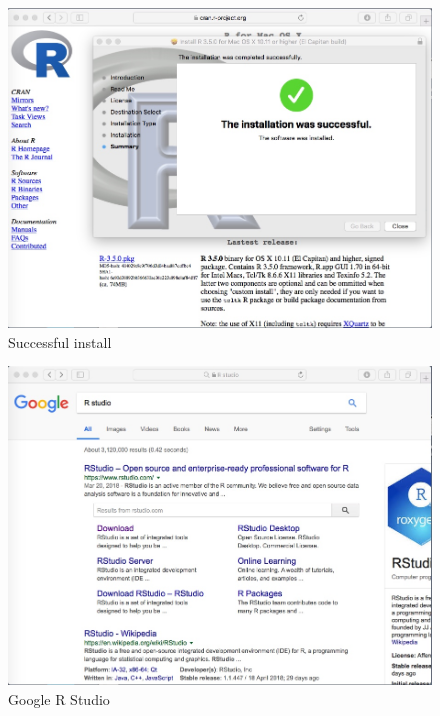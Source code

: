 \begin{figure}[h!] %
   \centering
   \includegraphics[width=5in]{./1-Introduction/MacSuccessR.jpeg} 
   \caption{Successful install}
\end{figure}

\begin{figure}[h!] %
   \centering
   \includegraphics[width=5in]{./1-Introduction/GoogleRStudio4Mac.jpeg} 
   \caption{Google R Studio}
\end{figure}


